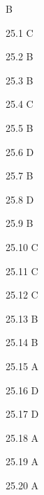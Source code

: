 \begin{Solution}{25}
B
\end{Solution}
\begin{Solution}{25.{1}}
C
\end{Solution}
\begin{Solution}{25.{2}}
B
\end{Solution}
\begin{Solution}{25.{3}}
B
\end{Solution}
\begin{Solution}{25.{4}}
C
\end{Solution}
\begin{Solution}{25.{5}}
B
\end{Solution}
\begin{Solution}{25.{6}}
D
\end{Solution}
\begin{Solution}{25.{7}}
B
\end{Solution}
\begin{Solution}{25.{8}}
D
\end{Solution}
\begin{Solution}{25.{9}}
B
\end{Solution}
\begin{Solution}{25.{10}}
C
\end{Solution}
\begin{Solution}{25.{11}}
C
\end{Solution}
\begin{Solution}{25.{12}}
C
\end{Solution}
\begin{Solution}{25.{13}}
B
\end{Solution}
\begin{Solution}{25.{14}}
B
\end{Solution}
\begin{Solution}{25.{15}}
A
\end{Solution}
\begin{Solution}{25.{16}}
D
\end{Solution}
\begin{Solution}{25.{17}}
D
\end{Solution}
\begin{Solution}{25.{18}}
A
\end{Solution}
\begin{Solution}{25.{19}}
A
\end{Solution}
\begin{Solution}{25.{20}}
A
\end{Solution}
